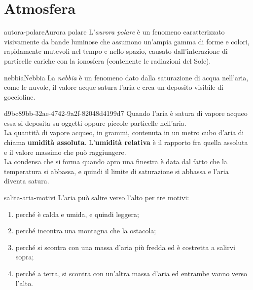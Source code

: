 \documentclass[preview]{standalone}
\begin{document}
\genpage

\section{Atmosfera}

\begin{snippetdefinition}{autora-polare}{Aurora polare}
    L'\textit{aurora polare} è un fenomeno
    caratterizzato visivamente da bande luminose che assumono un'ampia gamma di forme e colori, rapidamente mutevoli nel tempo e nello spazio,
    causato dall'interazione di particelle cariche con la ionosfera (contenente le radiazioni del Sole).
\end{snippetdefinition}



\begin{snippetdefinition}{nebbia}{Nebbia}
    La \textit{nebbia} è un fenomeno dato dalla saturazione di acqua nell'aria,
    come le nuvole, il valore acque satura l'aria e crea un deposito visibile di goccioline.
\end{snippetdefinition}

\begin{snippet}{d9bc89bb-32ae-4742-9a2f-82048d4199d7}
    Quando l'aria è satura di vapore acqueo essa si deposita su oggetti oppure piccole particelle nell'aria.
    \\
    La quantità di vapore acqueo, in grammi, contenuta in un metro cubo d'aria di chiama \textbf{umidità assoluta}.
    L'\textbf{umidità relativa} è il rapporto fra quella assoluta e il valore massimo che può raggiungere.
    \\    
    La condensa che si forma quando apro una finestra è data dal fatto che la temperatura si abbassa, e quindi
    il limite di saturazione si abbassa e l'aria diventa satura.
\end{snippet}

\begin{snippet}{salita-aria-motivi}
    L'aria può salire verso l'alto per tre motivi:
    \begin{enumerate}
        \item perché è calda e umida, e quindi leggera;
        \item perché incontra una montagna che la ostacola;
        \item perché si scontra con una massa d'aria più fredda ed è costretta a salirvi sopra;
        \item perché a terra, si scontra con un'altra massa d'aria ed entrambe vanno verso l'alto.
    \end{enumerate}
\end{snippet}
\end{document}
